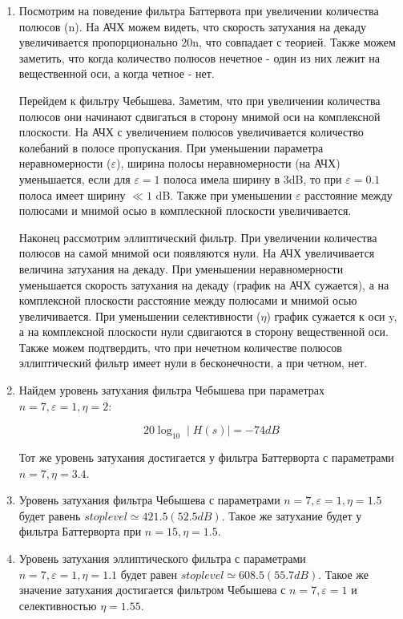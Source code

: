 \documentclass[a4paper, 12pt]{article}%
\begin{document}
\begin{enumerate}

\item Посмотрим на поведение фильтра Баттервота при увеличении количества полюсов (n). На АЧХ можем видеть, что скорость затухания на декаду увеличивается пропорционально 20n, что совпадает с теорией. Также можем заметить, что когда количество полюсов нечетное - один из них лежит на вещественной оси, а когда четное - нет.

Перейдем к фильтру Чебышева. Заметим, что при увеличении количества полюсов они начинают сдвигаться в сторону мнимой оси на комплексной плоскости. На АЧХ с увеличением полюсов увеличивается количество колебаний в полосе пропускания. При уменьшении параметра неравномерности ($\varepsilon$), ширина полосы неравномерности (на АЧХ) уменьшается, если для $\varepsilon = 1$ полоса имела ширину в 3dB, то при $\varepsilon = 0.1$ полоса имеет ширину $\ll 1$ dB. Также при уменьшении $\varepsilon$ расстояние между полюсами и мнимой осью в комплескной плоскости увеличивается.

Наконец рассмотрим эллиптический фильтр. При увеличении количества полюсов на самой мнимой оси появляются нули. На АЧХ увеличивается величина затухания на декаду. При уменьшении неравномерности уменьшается скорость затухания на декаду (график на АЧХ сужается), а на комплексной плоскости расстояние между полюсами и мнимой осью увеличивается. При уменьшении селективности ($\eta$) график сужается к оси y, а на комплексной плоскости нули сдвигаются в сторону вещественной оси. Также можем подтвердить, что при нечетном количестве полюсов эллиптический фильтр имеет нули в бесконечности, а при четном, нет.

\item Найдем уровень затухания фильтра Чебышева при параметрах $n = 7, \varepsilon = 1, \eta = 2$:

\[20 \log_{10} \mid H(s)\mid = -74 dB\]

Тот же уровень затухания достигается у фильтра Баттерворта с параметрами $n = 7, \eta = 3.4$.

\item Уровень затухания фильтра Чебышева с параметрами $n = 7, \varepsilon = 1, \eta = 1.5$ будет равень $stoplevel \simeq 421.5 (52.5 dB)$. Такое же затухание будет у фильтра Баттерворта при $n = 15, \eta = 1.5$.

\item Уровень затухания эллиптического фильтра с параметрами $n = 7, \varepsilon = 1, \eta = 1.1$ будет равен $stoplevel \simeq 608.5 (55.7 dB)$. Такое же значение затухания достигается фильтром Чебышева с $n = 7, \varepsilon = 1$ и селективностью $\eta = 1.55$.


\end{enumerate}
\end{document}
